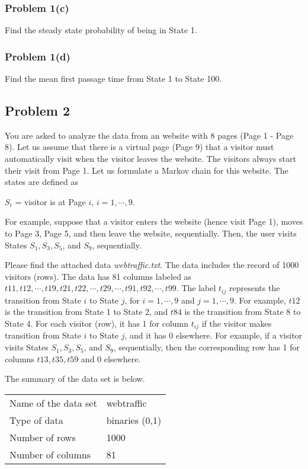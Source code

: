 \documentclass{article}
\begin{document}
\subsubsection*{Problem 1(c)}
Find the steady state probability of being in State 1.




\subsubsection*{Problem 1(d)}
Find the mean first passage time from State 1 to State 100.



\subsection*{Problem 2}
You are asked to analyze the data from an website with 8 pages (Page 1 - Page 8). Let us assume that there is a virtual page (Page 9) that a visitor must automatically visit when the visitor leaves the website. The visitors always start their visit from Page 1. Let us formulate a Markov chain for this website. The states are defined as 
\begin{center}
$S_i$ = visitor is at Page $i$, $i=1,\cdots,9$.
\end{center}
For example, suppose that a visitor enters the website (hence visit Page 1), moves to Page 3, Page 5, and then leave the website, sequentially. Then, the user visits States $S_1,S_3,S_5$, and $S_9$, sequentially.

Please find the attached data \textit{webtraffic.txt}. The data includes the record of 1000 visitors (rows). The data has 81 columns labeled as $t11,t12,\cdots,t19,t21,t22,\cdots,t29,\cdots,t91,t92,\cdots,t99$. The label $t_{ij}$ represents the transition from State $i$ to State $j$, for $i=1,\cdots,9$ and $j=1,\cdots,9$. For example, $t12$ is the transition from State 1 to State 2, and $t84$ is the transition from State 8 to State 4. For each visitor (row), it has 1 for column $t_{ij}$ if the visitor makes transition from State $i$ to State $j$, and it has 0 elsewhere. For example, if a visitor visits States $S_1,S_3,S_5$, and $S_9$, sequentially, then the corresponding row has 1 for columns $t13,t35,t59$ and 0 elsewhere.

The summary of the data set is below.
\vspace{0.2cm}

\begin{tabular}{ll}
Name of the data set & webtraffic\\
Type of data & binaries (0,1)\\
Number of rows & 1000\\
Number of columns & 81
\end{tabular}
\end{document}
